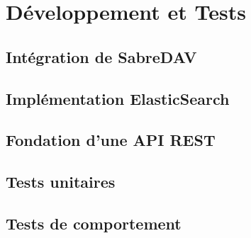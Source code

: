 \section{Développement et Tests}

\subsection{Intégration de SabreDAV}

\subsection{Implémentation ElasticSearch}

\subsection{Fondation d'une API REST}


\subsection{Tests unitaires}

\subsection{Tests de comportement}